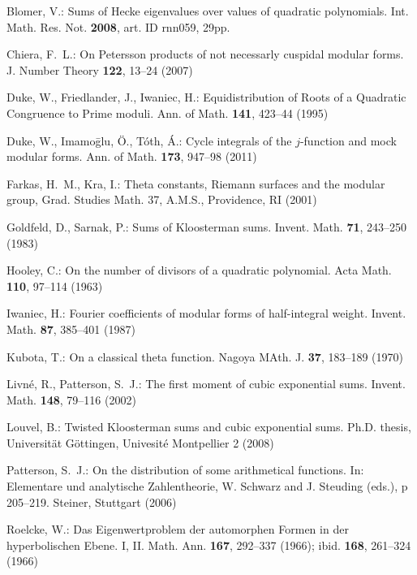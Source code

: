 \documentclass[leqno,10pt]{amsart}
\theoremstyle{plain}
\numberwithin{equation}{section}
\theoremstyle{definition}
\theoremstyle{remark}
\begin{document}
\begin{thebibliography}{}

  Blomer, V.:  Sums of {H}ecke eigenvalues over values of quadratic polynomials.
      Int. Math. Res. Not. {\bf 2008}, art. ID rnn059, 29pp.

 Chiera, F.~L.: On Petersson products of not necessarly cuspidal modular forms. J. Number Theory {\bf 122}, 13--24 (2007)

 Duke, W., Friedlander, J., Iwaniec, H.: Equidistribution of Roots of a Quadratic Congruence to Prime moduli. Ann. of Math. {\bf 141}, 423--44 (1995)

  Duke, W.,   Imamo\=glu, \"O.,     T\'oth, \'A.:   Cycle integrals of the $j$-function and mock modular forms.     Ann. of Math. {\bf 173},   947--98   (2011)

 Farkas, H.~M.,   Kra, I.: Theta constants, {R}iemann surfaces and the modular group,  Grad. Studies Math. 37, A.M.S.,   Providence, RI    (2001)

  Goldfeld, D.,   Sarnak, P.:   Sums of {K}loosterman sums.      Invent. Math. {\bf 71}, 243--250  (1983)

 Hooley, C.:  On the number of divisors of a quadratic polynomial.    Acta Math. {\bf 110},  97--114  (1963)

 Iwaniec, H.:    Fourier coefficients of modular forms of half-integral weight.  Invent. Math. {\bf 87}, 385--401  (1987)

 Kubota, T.: On a classical theta function. Nagoya MAth. J. {\bf 37}, 183--189 (1970)
%

   Livn\'e, R.,  Patterson, S.~J.:  The first moment of cubic exponential sums.  Invent. Math. {\bf 148}, 79--116   (2002)

 Louvel, B.: Twisted Kloosterman sums and cubic exponential sums. Ph.D. thesis, Universit\"at G\"ottingen, Univesit\'e Montpellier 2 (2008)

 Patterson, S.~J.: On the distribution of some arithmetical functions. In: Elementare und analytische Zahlentheorie, W. Schwarz and J. Steuding (eds.), p 205--219. Steiner, Stuttgart (2006)

 Roelcke, W.: Das Eigenwertproblem der automorphen Formen in der hyperbolischen Ebene. I, II. Math. Ann. {\bf 167}, 292--337 (1966); ibid. {\bf 168}, 261--324 (1966)


\end{thebibliography}
\end{document}

